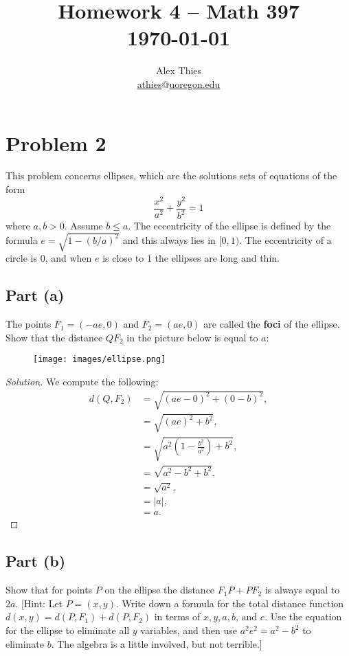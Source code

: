\documentclass[letterpaper, 12pt]{amsart}
\theoremstyle{definition}  %
\begin{document}
	\title{Homework 4  -- Math 397 \\ \today}
	\author{Alex Thies \\ \href{mailto:athies@uoregon.edu}{\lowercase{athies$@$uoregon.edu}}}

	\maketitle

	\section*{Problem 2}
	This problem concerns ellipses, which are the solutions sets of equations of the form $$\frac{x^{2}}{a^{2}} + \frac{y^{2}}{b^{2}} = 1$$ where $a, b > 0$. 
	Assume $b \leq a$. 
	The eccentricity of the ellipse is defined by the formula $e = \sqrt{1 - (b/a)^{2}}$ and this always lies in $[0, 1)$. 
	The eccentricity of a circle is $0$, and when $e$ is close to $1$ the ellipses are long and thin.

		\subsection*{Part (a)}
		The points $F_{1} = (-ae, 0)$ and $F_{2} = (ae, 0)$ are called the \textbf{foci} of the ellipse. 
		Show that the distance $QF_{2}$ in the picture below is equal to $a$:
		\begin{figure}[h]
			\texttt{[image: images/ellipse.png]}
			\label{ellipse}
		\end{figure}

		\begin{proof}[Solution]
		We compute the following:
			\begin{align*}
				d(Q,F_2) &= \sqrt{(ae - 0)^2 + (0 - b)^2}, \\
	            &= \sqrt{(ae)^2 + b^2}, \\
	            &= \sqrt{a^2 \left(1 - \tfrac{b^2}{a^2} \right) + b^2}, \\
	            &= \sqrt{a^2 - b^2 + b^2}, \\
	            &= \sqrt{a^2}, \\
	            &= |a|, \\
				&= a.
			\end{align*}
									
		\end{proof}

		\subsection*{Part (b)}
		Show that for points $P$ on the ellipse the distance $F_{1}P +PF_{2}$ is always equal to $2a$.
		[Hint: Let $P = (x, y)$. 
		Write down a formula for the total distance function $d(x, y) = d(P, F_{1}) + d(P, F_{2})$ in terms of $x, y, a, b$, and $e$. 
		Use the equation for the ellipse to eliminate all $y$ variables, and then use $a^{2}e^{2} = a^{2} − b^{2}$ to eliminate $b$. 
		The algebra is a little involved, but not terrible.]
\end{document}
